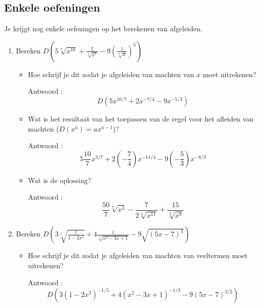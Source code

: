 \subsection{Enkele oefeningen}
Je krijgt nog enkele oefeningen op het berekenen van afgeleiden.

\begin{enumerate}
	
	\item Bereken $D \left( 5\sqrt[7] {x^{10}}+\frac {2}{\sqrt[4]{x^7}}-9 \left( \frac {1}{\sqrt [3]{x}}  \right)^5 \right)$
	
	\begin{itemize}
		\item Hoe schrijf je dit zodat je afgeleiden van machten van $x$ moet uitrekenen?
		
		Antwoord : \[D \left(  5x^{10/7}+2x^{-7/4}-9x^{-5/3}  \right)\]
		
		\item Wat is het resultaat van het toepassen van de regel voor het afleiden van machten ($D(x^a)=ax^{a-1}$)?
		
		Antwoord : \[5\frac{10}{7}x^{3/7}+2\left( -\frac{7}{4} \right)x^{-11/4}-9\left(  -\frac{5}{3}  \right) x^{-8/3}\]
		
		\item Wat is de oplossing?
		
		Antwoord : \[\frac {50}{7}\sqrt[7]{x^3}-\frac{7}{2\sqrt[4]{x^{11}}}+\frac{15}{\sqrt[3]{x^8}}\]
		
	\end{itemize}
	
	\item Bereken $D \left(  3 \sqrt[5]{\frac{1}{1-2x^3}}+4\frac{1}{\sqrt[3]{x^2-3x+1}}-9\sqrt{(5x-7)^3}  \right)$
	
	\begin{itemize}
		
		\item Hoe schrijf je dit zodat je afgeleiden van machten van veeltermen moet uitrekenen?
		
		Antwoord : \[D \left( 3 \left(  1-2x^3 \right)^{-1/5}+4 \left( x^2-3x+1  \right)^{-1/3}-9 \left(  5x-7 \right)^{3/2}  \right)\]
		

\end{itemize}
\end{enumerate}
